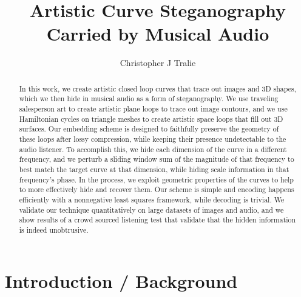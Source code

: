 \documentclass[runningheads]{llncs}
\begin{document}
%
\title{Artistic Curve Steganography Carried by Musical Audio}
%
%
\author{Christopher J Tralie}
%
%
%
\maketitle              %
%
\begin{abstract}

  In this work, we create artistic closed loop curves that trace out images and 3D shapes, which we then hide in musical audio as a form of steganography.  We use traveling salesperson art to create artistic plane loops to trace out image contours, and we use Hamiltonian cycles on triangle meshes to create artistic space loops that fill out 3D surfaces. Our embedding scheme is designed to faithfully preserve the geometry of these loops after lossy compression, while keeping their presence undetectable to the audio listener. To accomplish this, we hide each dimension of the curve in a different frequency, and we perturb a sliding window sum of the magnitude of that frequency to best match the target curve at that dimension, while hiding scale information in that frequency's phase.  In the process, we exploit geometric properties of the curves to help to more effectively hide and recover them.  Our scheme is simple and encoding happens efficiently with a nonnegative least squares framework, while decoding is trivial.  We validate our technique quantitatively on large datasets of images and audio, and we show results of a crowd sourced listening test that validate that the hidden information is indeed unobtrusive.



  

\end{abstract}
%
%
%
\section{Introduction / Background}
\end{document}
